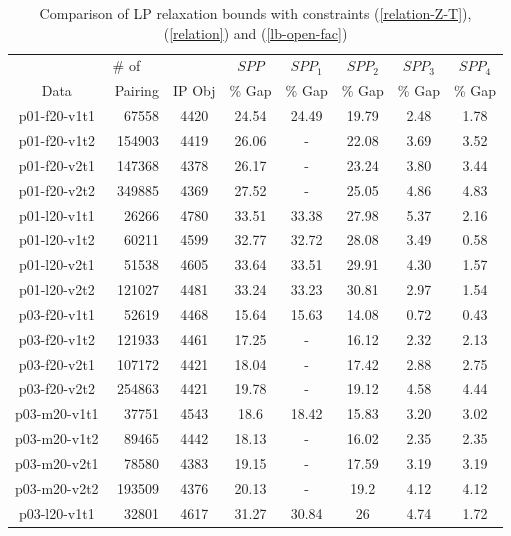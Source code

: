 \begin{table}[!h]
\centering
\caption{Comparison of LP relaxation bounds with constraints (\ref{relation-Z-T}),
(\ref{relation}) and (\ref{lb-open-fac})} \label{lpbounds-gr1}
\begin {tabular}[!h]{|c|r|c|c|c|c|c|c|}
\hline
\mbox{} & \# of \ \  & \mbox{} & $SPP$  & $SPP_1$ & $SPP_2$  & $SPP_3$ & $SPP_4$\\
Data     & Pairing  & IP Obj  & \% Gap & \% Gap & \% Gap    & \% Gap  & \% Gap  \\\hline
p01-f20-v1t1    & 67558 & 4420  & 24.54 & 24.49 & 19.79 & 2.48  & 1.78  \\
p01-f20-v1t2    & 154903 & 4419 & 26.06 & \mbox{-}  & 22.08 & 3.69  & 3.52  \\
p01-f20-v2t1    & 147368 & 4378 & 26.17 & \mbox{-}  & 23.24 & 3.80  & 3.44  \\
p01-f20-v2t2    & 349885 & 4369 & 27.52 & \mbox{-}  & 25.05 & 4.86  & 4.83  \\\hline
p01-l20-v1t1    & 26266 & 4780  & 33.51 & 33.38 &   27.98   & 5.37  & 2.16  \\
p01-l20-v1t2    & 60211 & 4599  & 32.77 & 32.72 &   28.08   & 3.49  & 0.58  \\
p01-l20-v2t1    & 51538 & 4605  & 33.64 & 33.51 &   29.91   & 4.30  & 1.57  \\
p01-l20-v2t2    & 121027 & 4481 & 33.24 & 33.23 &   30.81   & 2.97  & 1.54  \\\hline
p03-f20-v1t1    & 52619 & 4468  & 15.64 & 15.63 &   14.08   & 0.72  & 0.43  \\
p03-f20-v1t2    & 121933 & 4461 & 17.25 & \mbox{-}  &   16.12   & 2.32  & 2.13  \\
p03-f20-v2t1    & 107172 & 4421 & 18.04 & \mbox{-}  &   17.42   & 2.88  & 2.75  \\
p03-f20-v2t2    & 254863 & 4421 & 19.78 & \mbox{-}  &   19.12   & 4.58  & 4.44  \\\hline
p03-m20-v1t1    & 37751 & 4543  & 18.6  & 18.42 &   15.83   &   3.20    &   3.02    \\
p03-m20-v1t2    & 89465 & 4442  & 18.13 & \mbox{-}  &   16.02   & 2.35  & 2.35  \\
p03-m20-v2t1    & 78580 & 4383  & 19.15 & \mbox{-}  &   17.59   & 3.19  & 3.19  \\
p03-m20-v2t2    & 193509 & 4376 & 20.13 & \mbox{-}  &   19.2    & 4.12  & 4.12  \\\hline
p03-l20-v1t1    & 32801 & 4617  & 31.27 & 30.84 &   26  & 4.74  & 1.72  \\

\end{tabular}
\end{table}
